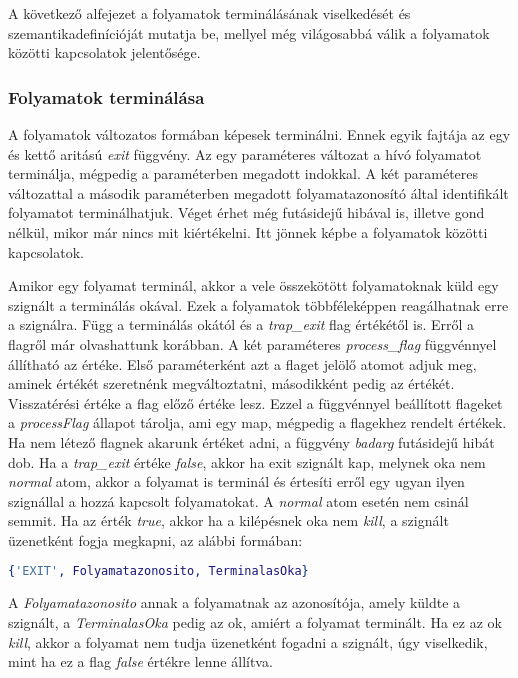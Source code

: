A következő alfejezet a folyamatok terminálásának viselkedését és szemantikadefinícióját mutatja be, mellyel még világosabbá válik a folyamatok közötti kapcsolatok jelentősége.

\subsubsection{Folyamatok terminálása}

A folyamatok változatos formában képesek terminálni. Ennek egyik fajtája az egy és kettő aritású \textit{exit} függvény. Az egy paraméteres változat a hívó folyamatot terminálja, mégpedig a paraméterben megadott indokkal. A két paraméteres változattal a második paraméterben megadott folyamatazonosító által identifikált folyamatot terminálhatjuk. Véget érhet még futásidejű hibával is, illetve gond nélkül, mikor már nincs mit kiértékelni. Itt jönnek képbe a folyamatok közötti kapcsolatok.

Amikor egy folyamat terminál, akkor a vele összekötött folyamatoknak küld egy szignált a terminálás okával. Ezek a folyamatok többféleképpen reagálhatnak erre a szignálra. Függ a terminálás okától és a \textit{trap\_exit} flag értékétől is. Erről a flagről már olvashattunk korábban. A két paraméteres \textit{process\_flag} függvénnyel állítható az értéke. Első paraméterként azt a flaget jelölő atomot adjuk meg, aminek értékét szeretnénk megváltoztatni, másodikként pedig az értékét. Visszatérési értéke a flag előző értéke lesz. Ezzel a függvénnyel beállított flageket a \textit{processFlag} állapot tárolja, ami egy map, mégpedig a flagekhez rendelt értékek. Ha nem létező flagnek akarunk értéket adni, a függvény \textit{badarg} futásidejű hibát dob. Ha a \textit{trap\_exit} értéke \textit{false}, akkor ha exit szignált kap, melynek oka nem \textit{normal} atom, akkor a folyamat is terminál és értesíti erről egy ugyan ilyen szignállal a hozzá kapcsolt folyamatokat. A \textit{normal} atom esetén nem csinál semmit. Ha az érték \textit{true}, akkor ha a kilépésnek oka nem \textit{kill}, a szignált üzenetként fogja megkapni, az alábbi formában:

\begin{lstlisting}[language=Erlang]
{'EXIT', Folyamatazonosito, TerminalasOka}
\end{lstlisting}

A \textit{Folyamatazonosito} annak a folyamatnak az azonosítója, amely küldte a szignált, a \textit{TerminalasOka} pedig az ok, amiért a folyamat terminált. Ha ez az ok \textit{kill}, akkor a folyamat nem tudja üzenetként fogadni a szignált, úgy viselkedik, mint ha ez a flag \textit{false} értékre lenne állítva.

